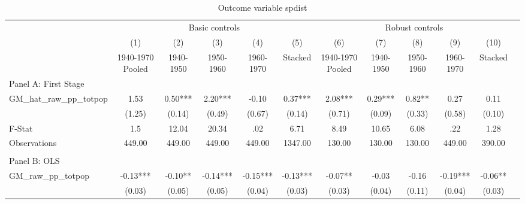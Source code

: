  \begin{table}[htbp]\centering {} \begin{threeparttable} \caption{Outcome variable spdist } \begin{tabular}{l*{11}{c}} \toprule
          &\multicolumn{5}{c}{Basic controls}                                   &\multicolumn{5}{c}{Robust controls}                                  \\\cmidrule(lr){2-6}\cmidrule(lr){7-11}
          &\multicolumn{1}{c}{(1)}&\multicolumn{1}{c}{(2)}&\multicolumn{1}{c}{(3)}&\multicolumn{1}{c}{(4)}&\multicolumn{1}{c}{(5)}&\multicolumn{1}{c}{(6)}&\multicolumn{1}{c}{(7)}&\multicolumn{1}{c}{(8)}&\multicolumn{1}{c}{(9)}&\multicolumn{1}{c}{(10)}\\
          &\multicolumn{1}{c}{1940-1970 Pooled}&\multicolumn{1}{c}{1940-1950}&\multicolumn{1}{c}{1950-1960}&\multicolumn{1}{c}{1960-1970}&\multicolumn{1}{c}{Stacked}&\multicolumn{1}{c}{1940-1970 Pooled}&\multicolumn{1}{c}{1940-1950}&\multicolumn{1}{c}{1950-1960}&\multicolumn{1}{c}{1960-1970}&\multicolumn{1}{c}{Stacked}\\
\cmidrule(lr){1-11}
\multicolumn{10}{l}{Panel A: First Stage}\\
\cmidrule(lr){1-11}
GM\_hat\_raw\_pp\_totpop&      1.53   &      0.50***&      2.20***&     -0.10   &      0.37***&      2.08***&      0.29***&      0.82** &      0.27   &      0.11   \\
          &    (1.25)   &    (0.14)   &    (0.49)   &    (0.67)   &    (0.14)   &    (0.71)   &    (0.09)   &    (0.33)   &    (0.58)   &    (0.10)   \\
\midrule
F-Stat    &       1.5   &     12.04   &     20.34   &       .02   &      6.71   &      8.49   &     10.65   &      6.08   &       .22   &      1.28   \\
Observations&    449.00   &    449.00   &    449.00   &    449.00   &   1347.00   &    130.00   &    130.00   &    130.00   &    449.00   &    390.00   \\
\cmidrule[\heavyrulewidth](lr){1-11} \\ \cmidrule[\heavyrulewidth](lr){1-11}
\multicolumn{10}{l}{Panel B: OLS}\\
\cmidrule(lr){1-11}
GM\_raw\_pp\_totpop&     -0.13***&     -0.10** &     -0.14***&     -0.15***&     -0.13***&     -0.07** &     -0.03   &     -0.16   &     -0.19***&     -0.06** \\
          &    (0.03)   &    (0.05)   &    (0.05)   &    (0.04)   &    (0.03)   &    (0.03)   &    (0.04)   &    (0.11)   &    (0.04)   &    (0.03)   \\

\end{tabular}
\end{threeparttable}
\end{table}
